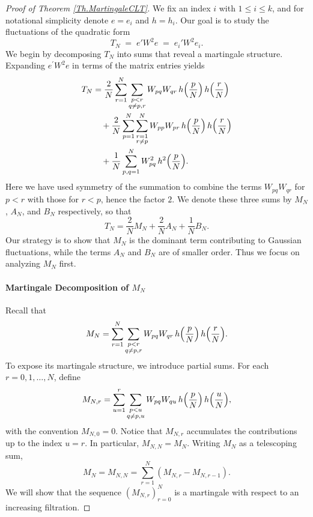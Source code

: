 \documentclass[11pt, reqno]{amsart}
\numberwithin{equation}{section}
\begin{document}
\begin{proof}[Proof of Theorem \ref{Th.MartingaleCLT}]


We fix an index $i$ with $1 \le i \le k$, and for notational simplicity denote $e = e_i$ and $h = h_i$.  Our goal is to study the fluctuations of the quadratic form
\[
T_N \;=\; e' W^2 e \;=\; e_i' W^2 e_i.
\]
We begin by decomposing $T_N$ into sums that reveal a martingale structure.  Expanding $e^\prime W^2 e$ in terms of the matrix entries yields
\[
\begin{aligned}
T_N 
 &= \frac{2}{N}\sum_{r=1}^N\sum_{\substack{p<r\\ q\neq p,r}} W_{pq}W_{qr}\,h\Bigl(\frac{p}{N}\Bigr)\,h\Bigl(\frac{r}{N}\Bigr) \\
 &\quad + \frac{2}{N}\sum_{p=1}^N\sum_{\substack{r=1 \\ r\neq p}}^N W_{pp}W_{pr}\,h\Bigl(\frac{p}{N}\Bigr)\,h\Bigl(\frac{r}{N}\Bigr) \\
 &\quad + \frac{1}{N}\sum_{p,q=1}^N W_{pq}^2\,h^2\Bigl(\frac{p}{N}\Bigr).
\end{aligned}
\]
Here we have used symmetry of the summation to combine the terms $W_{pq}W_{qr}$ for $p<r$ with those for $r<p$, hence the factor $2$.  We denote these three sums by $M_N$, $A_N$, and $B_N$ respectively, so that
\begin{equation}\label{eq:T_N}
T_N =\frac{2}{N}M_N + \frac{2}{N}A_N + \frac{1}{N}B_N.
\end{equation}
Our strategy is to show that $M_N$ is the dominant term contributing to Gaussian fluctuations, while the terms $A_N$ and $B_N$ are of smaller order.  Thus we focus on analyzing $M_N$ first.

\paragraph{\bf Martingale Decomposition of \(M_N\)}

Recall that
\[
M_N = \sum_{r=1}^N \sum_{\substack{p<r\\ q\neq p,r}} W_{pq}W_{qr}\,h\Bigl(\frac{p}{N}\Bigr)\,h\Bigl(\frac{r}{N}\Bigr).
\]
To expose its martingale structure, we introduce partial sums.  For each $r=0,1,\dots,N$, define
\[
M_{N,r} = \sum_{u=1}^r \sum_{\substack{p<u\\ q\neq p,u}} W_{pq}W_{qu}\,h\Bigl(\frac{p}{N}\Bigr)\,h\Bigl(\frac{u}{N}\Bigr),
\]
with the convention $M_{N,0}=0$.  Notice that $M_{N,r}$ accumulates the contributions up to the index $u=r$.  In particular, $M_{N,N} = M_N$.  Writing $M_N$ as a telescoping sum,
\[
M_N = M_{N,N} = \sum_{r=1}^N (M_{N,r} - M_{N,r-1}).
\]
We will show that the sequence $(M_{N,r})_{r=0}^N$ is a martingale with respect to an increasing filtration.


\end{proof}
\end{document}
